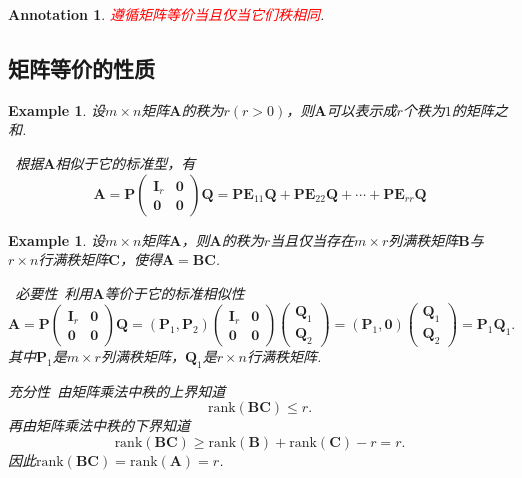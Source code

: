 \documentclass{article}
\newtheorem{example}[theorem]{Example}
\newtheorem{annotation}[theorem]{Annotation}
\newcommand{\hints}{{\color{blue} \text{hints}}}
\newcommand{\mbf}[1]{\bm{#1}}
\newcommand{\rank}[1]{\text{rank}\left(#1\right)} %
\newcommand{\redt}[1]{\textcolor{red}{#1}}
\begin{document}
\begin{annotation}
\rm \redt{遵循矩阵等价当且仅当它们秩相同}.
\end{annotation}

\subsection{矩阵等价的性质}

\begin{example}
\rm 设$m \times n$矩阵$\mbf{A}$的秩为$r(r>0)$，则$\mbf{A}$可以表示成$r$个秩为$1$的矩阵之和. 

\hints\ 根据$\mbf{A}$相似于它的标准型，有
$$
\mbf{A} = \mbf{P}\begin{pmatrix}
\mbf{I}_r & \mbf{0} \\
\mbf{0} & \mbf{0}
\end{pmatrix}\mbf{Q} = \mbf{P}\mbf{E}_{11}\mbf{Q} + \mbf{P}\mbf{E}_{22}\mbf{Q} + \cdots + \mbf{P}\mbf{E}_{rr}\mbf{Q}
$$
\end{example}

\begin{example}
\rm 设$m \times n$矩阵$\mbf{A}$，则$\mbf{A}$的秩为$r$当且仅当存在$m \times r$列满秩矩阵$\mbf{B}$与$r \times n$行满秩矩阵$\mbf{C}$，使得$\mbf{A}=\mbf{B}\mbf{C}$. 

\hints\ \emph{必要性}\ 利用$\mbf{A}$等价于它的标准相似性
$$
\mbf{A} = \mbf{P}\begin{pmatrix}
\mbf{I}_r & \mbf{0} \\
\mbf{0} & \mbf{0}
\end{pmatrix}\mbf{Q} = (\mbf{P}_1, \mbf{P}_2)\begin{pmatrix}
\mbf{I}_r & \mbf{0} \\
\mbf{0} & \mbf{0}
\end{pmatrix}\begin{pmatrix}
\mbf{Q}_1 \\
\mbf{Q}_2 
\end{pmatrix} = (\mbf{P}_1, \mbf{0})\begin{pmatrix}
\mbf{Q}_1 \\
\mbf{Q}_2 
\end{pmatrix} = \mbf{P}_1\mbf{Q}_1.
$$
其中$\mbf{P}_1$是$m \times r$列满秩矩阵，$\mbf{Q}_1$是$r \times n$行满秩矩阵. 

\emph{充分性}\ 由矩阵乘法中秩的上界知道
$$
\rank{\mbf{BC}} \leq r.
$$ 
再由矩阵乘法中秩的下界知道
$$
\rank{\mbf{BC}} \geq \rank{\mbf{B}} + \rank{\mbf{C}} -r =r.
$$
因此$\rank{\mbf{BC}} = \rank{\mbf{A}} = r$. 
\end{example}
\end{document}
